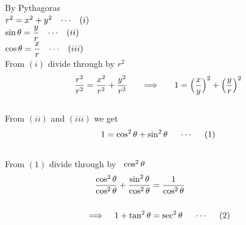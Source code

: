 \documentclass[11pt,a4paper]{article}
\begin{document}
\begin{figure}[H]
\centering
{}
\end{figure}

















By Pythagoras\\

$r^2 = x^2 + y^2\hspace{0.3cm} \cdots\hspace{0.3cm} (i)$\\

$\sin \theta = \dfrac{y}{r}\hspace{0.3cm}\cdots\hspace{0.3cm} (ii)$\\

$\cos \theta = \dfrac{x}{r}\hspace{0.3cm}\cdots\hspace{0.3cm} (iii)$\\



From $(i)$ divide through by $r^2$\\

$$\dfrac{r^2}{r^2} = \dfrac{x^2}{r^2} + \dfrac{y^2}{r^2} \hspace{0.5cm} \implies \hspace{0.5cm} 1 = \Big(\dfrac{x}{y}\Big)^2 + \Big(\dfrac{y}{r}\Big)^2$$\\



From $(ii)$ and $(iii)$ we get $$1 = \cos^2\theta + \sin^2\theta\hspace{0.5cm}\cdots\hspace{0.5cm} (1)$$\\


From $(1)$ divide through by $\hspace{0.2cm}\cos^2\theta$
\begin{align*}
\dfrac{\cos^2\theta}{\cos^2\theta} + \dfrac{\sin^2\theta}{\cos^2\theta} & = \dfrac{1}{\cos^2 \theta}\\\\
\implies\hspace{0.3cm} 1 + \tan^2\theta & = \sec^2\theta \hspace{0.5cm} \cdots\hspace{0.5cm} (2)\\
\end{align*}
\end{document}
